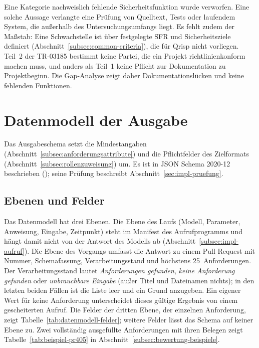 \documentclass[11pt,a4paper]{report}
\begin{document}
Eine Kategorie \glqq nachweislich fehlende Sicherheitsfunktion\grqq{} wurde
verworfen. Eine solche Aussage verlangte eine Prüfung von Quelltext,
Tests oder laufendem System, die außerhalb des Untersuchungsumfangs
liegt. Es fehlt zudem der Maßstab: Eine Schwachstelle ist über
festgelegte SFR und Sicherheitsziele definiert
(Abschnitt~\ref{subsec:common-criteria}), die für Qrisp nicht vorliegen.
Teil~2 der TR-03185 bestimmt keine Partei, die ein Projekt
richtlinienkonform machen muss, und anders als Teil~1
\cite[Tab.~14, PROD.PM.A.2]{bsitr03185} keine Pflicht zur
Dokumentation zu Projektbeginn. Die Gap-Analyse zeigt daher
Dokumentationslücken und keine fehlenden Funktionen.

\section{Datenmodell der Ausgabe}
\label{sec:konzeption-datenmodell}

Das Ausgabeschema setzt die Mindestangaben
(Abschnitt~\ref{subsec:anforderungsattribute}) und die Pflichtfelder
des Zielformats (Abschnitt~\ref{subsec:rollenzuweisung}) um. Es ist in
JSON Schema 2020-12 beschrieben ();
seine Prüfung beschreibt Abschnitt~\ref{sec:impl-pruefung}.

\subsection{Ebenen und Felder}
\label{subsec:datenmodell-ebenen}
\label{subsec:datenmodell-felder}

Das Datenmodell hat drei Ebenen. Die Ebene des Laufs (Modell, Parameter,
Anweisung, Eingabe, Zeitpunkt) steht im Manifest des Aufrufprogramms und
hängt damit nicht von der Antwort des Modells ab
(Abschnitt~\ref{subsec:impl-aufruf}). Die Ebene des Vorgangs umfasst die
Antwort zu einem Pull Request mit Nummer, Schemafassung,
Verarbeitungsstand und höchstens 25~Anforderungen. Der
Verarbeitungsstand lautet \emph{Anforderungen gefunden}, \emph{keine
Anforderung gefunden} oder \emph{unbrauchbare Eingabe} (außer Titel und
Dateinamen nichts); in den letzten beiden Fällen ist die Liste leer und
ein Grund anzugeben. Ein eigener Wert für \glqq keine Anforderung\grqq{}
unterscheidet dieses gültige Ergebnis von einem gescheiterten Aufruf.
Die Felder der dritten Ebene, der einzelnen Anforderung, zeigt
Tabelle~\ref{tab:datenmodell-felder}; weitere Felder lässt das Schema
auf keiner Ebene zu. Zwei vollständig ausgefüllte Anforderungen mit
ihren Belegen zeigt Tabelle~\ref{tab:beispiel-pr405} in
Abschnitt~\ref{subsec:bewertung-beispiele}.
\end{document}

